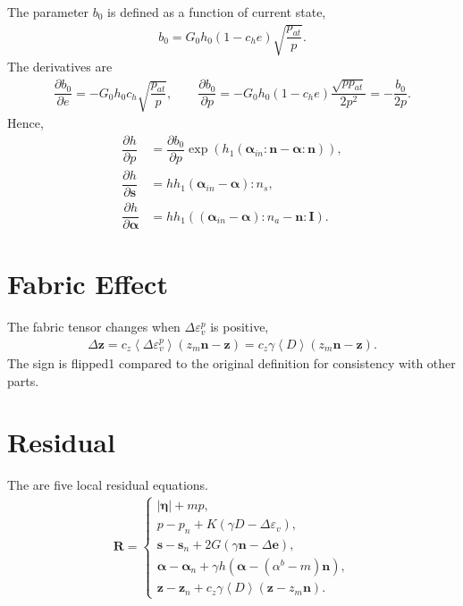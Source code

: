 \documentclass[11pt,a4paper]{article}
\newcommand*{\pfrac}[2]{\dfrac{\partial#1}{\partial#2}}
\begin{document}
The parameter $b_0$ is defined as a function of current state,
\begin{gather}
b_0=G_0h_0\left(1-c_he\right)\sqrt{\dfrac{p_{at}}{p}}.
\end{gather}
The derivatives are
\begin{gather}
\pfrac{b_0}{e}=-G_0h_0c_h\sqrt{\dfrac{p_{at}}{p}},\qquad
\pfrac{b_0}{p}=-G_0h_0\left(1-c_he\right)\dfrac{\sqrt{pp_{at}}}{2p^2}=-\dfrac{b_0}{2p}.
\end{gather}
Hence,
\begin{align}
\pfrac{h}{p}&=\pfrac{b_0}{p}\exp\left(h_1\left(\mathbold{\alpha}_{in}:\mathbold{n}-\mathbold{\alpha}:\mathbold{n}\right)\right),\\
\pfrac{h}{\mathbold{s}}&=hh_1\left(\mathbold{\alpha}_{in}-\mathbold{\alpha}\right):n_s,\\
\pfrac{h}{\mathbold{\alpha}}&=hh_1\left(\left(\mathbold{\alpha}_{in}-\mathbold{\alpha}\right):n_a-\mathbold{n}:\mathbf{I}\right).
\end{align}
\section{Fabric Effect}
The fabric tensor changes when $\Delta\varepsilon^p_v$ is positive,
\begin{gather}
\Delta\mathbold{z}=c_z\left\langle\Delta\varepsilon^p_v\right\rangle\left(z_m\mathbold{n}-\mathbold{z}\right)=c_z\gamma\left\langle{}D\right\rangle\left(z_m\mathbold{n}-\mathbold{z}\right).
\end{gather}
The sign is flipped1 compared to the original definition for consistency with other parts.
\section{Residual}
The are five local residual equations.
\begin{gather}
\mathbold{R}=\left\{\begin{array}{ll}
\big|\mathbold{\eta}\big|+mp,\\[2mm]
p-p_n+K\left(\gamma{}D-\Delta\varepsilon_v\right),\\[2mm]
\mathbold{s}-\mathbold{s}_n+2G\left(\gamma\mathbold{n}-\Delta\mathbold{e}\right),\\[2mm]
\mathbold{\alpha}-\mathbold{\alpha}_n+\gamma{}h\left(\mathbold{\alpha}-\left(\alpha^b-m\right)\mathbold{n}\right),\\[2mm]
\mathbold{z}-\mathbold{z}_n+c_z\gamma{}\left\langle{}D\right\rangle\left(\mathbold{z}-z_m\mathbold{n}\right).
\end{array}
\right.
\end{gather}
\end{document}
